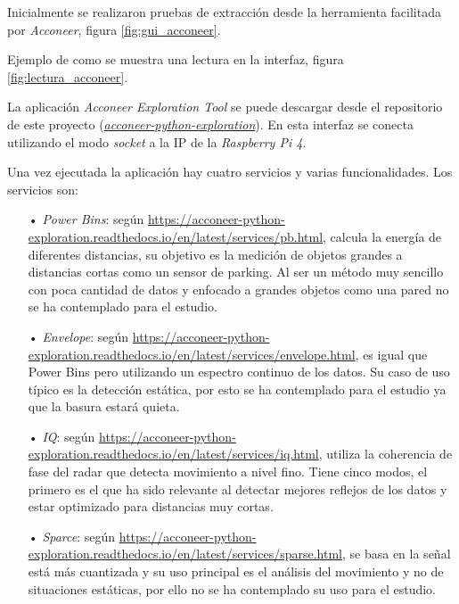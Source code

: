 Inicialmente se realizaron pruebas de extracción desde la herramienta facilitada por \textit{Acconeer}, figura \ref{fig:gui_acconeer}.


Ejemplo de como se muestra una lectura en la interfaz, figura \ref{fig:lectura_acconeer}.


La aplicación \textit{Acconeer Exploration Tool} se puede descargar desde el repositorio de este proyecto (\href{https://github.com/mecyc/TFG_RADAR_60GHZ/tree/main/acconeer-python-exploration}{\textit{acconeer-python-exploration}}). En esta interfaz se conecta utilizando el modo \textit{socket} a la IP de la \textit{Raspberry Pi 4}.
 
Una vez ejecutada la aplicación hay cuatro servicios y varias funcionalidades. Los servicios son:
\begin{itemize}
\item[•] \textit{Power Bins}: según \url{https://acconeer-python-exploration.readthedocs.io/en/latest/services/pb.html}, calcula la energía de diferentes distancias, su objetivo es la medición de objetos grandes a distancias cortas como un sensor de parking. Al ser un método muy sencillo con poca cantidad de datos y enfocado a grandes objetos como una pared no se ha contemplado para el estudio.
\item[•] \textit{Envelope}: según \url{https://acconeer-python-exploration.readthedocs.io/en/latest/services/envelope.html}, es igual que Power Bins pero utilizando un espectro continuo de los datos. Su caso de uso típico es la detección estática, por esto se ha contemplado para el estudio ya que la basura estará quieta.
\item[•] \textit{IQ}: según \url{https://acconeer-python-exploration.readthedocs.io/en/latest/services/iq.html}, utiliza la coherencia de fase del radar que detecta movimiento a nivel fino. Tiene cinco modos, el primero es el que ha sido relevante al detectar mejores reflejos de los datos y estar optimizado para distancias muy cortas.
\item[•] \textit{Sparce}: según \url{https://acconeer-python-exploration.readthedocs.io/en/latest/services/sparse.html}, se basa en la señal está más cuantizada y su uso principal es el análisis del movimiento y no de situaciones estáticas, por ello no se ha contemplado su uso para el estudio.
\end{itemize}

